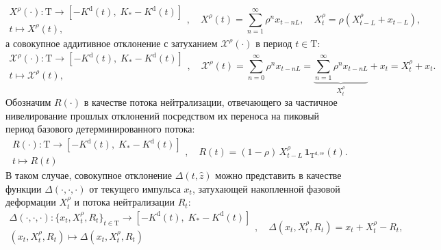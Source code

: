 \begin{equation}\begin{aligned} X^{\rho}(\cdot) : \mathrm{T} \longrightarrow \left[-K^{\mathrm{d}}(t), \; K_{*} - K^{\mathrm{d}}(t) \right] \\ t \longmapsto X^{\rho}(t), \end{aligned}, \quad X^{\rho}(t) = \sum_{n=1}^{\infty} \rho^{n} x_{t-nL}, \quad X_{t}^{\rho} = \rho (X^{\rho}_{t-L} + x_{t-L}),\end{equation}
а совокупное аддитивное отклонение с затуханием $\mathcal{X}^{\rho}(\cdot)$ в период $t \in \mathrm{T}$:
\begin{equation}\begin{aligned} \mathcal{X}^{\rho}(\cdot) : \mathrm{T} \longrightarrow \left[-K^{\mathrm{d}}(t), \; K_{*} - K^{\mathrm{d}}(t) \right] \\ t \longmapsto \mathcal{X}^{\rho}(t), \end{aligned}, \quad \mathcal{X}^{\rho}(t) = \sum_{n=0}^{\infty} \rho^{n} x_{t-nL} = \underbrace{\sum_{n=1}^{\infty} \rho^{n} x_{t-nL}}_{X_{t}^{\rho}} + x_{t} = X_{t}^{\rho} + x_t.\end{equation}
Обозначим $R(\cdot)$ в качестве потока нейтрализации, отвечающего за частичное нивелирование прошлых отклонений посредством их переноса на пиковый период базового детерминированного потока:
\begin{equation}\begin{aligned} R(\cdot) : \mathrm{T} \longrightarrow \left[-K^{\mathrm{d}}(t), \; K_{*} - K^{\mathrm{d}}(t) \right] \\ t \longmapsto R(t) \end{aligned}, \quad R(t)=(1-\rho)\,X^{\rho}_{t-L}\,\mathbf 1_{\mathrm{T}^{\mathrm{d,ce}}}(t).\end{equation}
В таком случае, совокупное отклонение $\Delta (t, \hat{z})$ можно представить в качестве функции $\Delta(\cdot, \cdot, \cdot)$ от текущего импульса $x_{t}$, затухающей накопленной фазовой деформации $X_{t}^{\rho}$ и потока нейтрализации $R_{t}$:
\begin{equation}\begin{aligned} \Delta(\cdot, \cdot, \cdot) : \{x_{t}, X^{\rho}_{t}, R_{t}\}_{t \in \mathrm{T}} \longrightarrow \left[-K^{\mathrm{d}}(t), \; K_{*} - K^{\mathrm{d}}(t) \right] \\ (x_{t}, X^{\rho}_{t}, R_{t}) \longmapsto \Delta (x_{t}, X^{\rho}_{t}, R_{t}) \end{aligned}, \quad \Delta (x_{t}, X^{\rho}_{t}, R_{t}) = x_{t} + X^{\rho}_{t} - R_{t},\end{equation}
